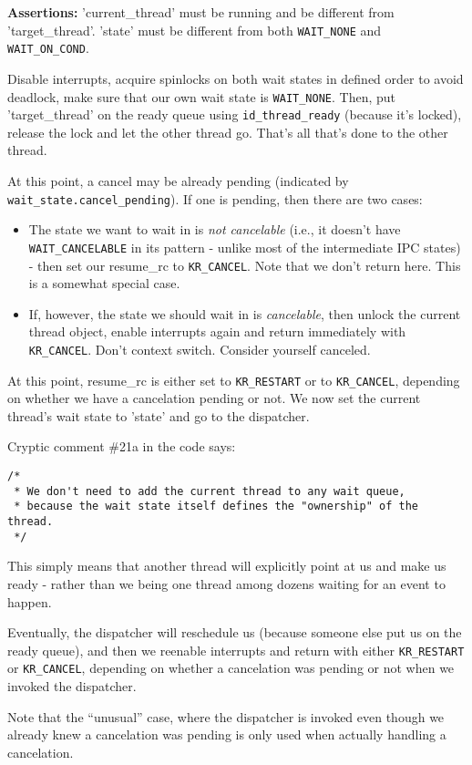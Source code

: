 \textbf{Assertions:} 'current_thread' must be running and be different
from 'target_thread'. 'state' must be different from both
\texttt{WAIT_NONE} and \texttt{WAIT_ON_COND}.

Disable interrupts, acquire spinlocks on both wait states in defined
order to avoid deadlock, make sure that our own wait state is
\texttt{WAIT_NONE}. Then, put 'target_thread' on the ready queue
using \texttt{id_thread_ready} (because it's locked), release
the lock and let the other thread go. That's all that's done to
the other thread.

At this point, a cancel may be already pending (indicated by
\texttt{wait_state.cancel_pending}). If one is pending, then there are
two cases:
\begin{itemize}
    \item The state we want to wait in is {\em not cancelable} (i.e.,
        it doesn't have \texttt{WAIT_CANCELABLE} in its pattern - unlike
        most of the intermediate IPC states) - then set our resume_rc
        to \texttt{KR_CANCEL}. Note that we don't return here.
        This is a somewhat special case.
    \item If, however, the state we should wait in is {\em cancelable},
        then unlock the current thread object, enable interrupts again
        and return immediately with \texttt{KR_CANCEL}.
        Don't context switch. Consider yourself canceled.
\end{itemize}
At this point, resume_rc is either set to \texttt{KR_RESTART} or
to \texttt{KR_CANCEL}, depending on whether we have a cancelation
pending or not. We now set the current thread's wait state to 'state'
and go to the dispatcher.

Cryptic comment \#21a in the code says:
\begin{verbatim}
/*
 * We don't need to add the current thread to any wait queue,
 * because the wait state itself defines the "ownership" of the thread.
 */
\end{verbatim}
This simply means that another thread will explicitly point at us and
make us ready - rather than we being one thread among dozens waiting
for an event to happen.

Eventually, the dispatcher will reschedule us (because someone else
put us on the ready queue), and then we reenable interrupts and return
with either \texttt{KR_RESTART} or \texttt{KR_CANCEL}, depending on
whether a cancelation was pending or not when we invoked the
dispatcher.

Note that the ``unusual'' case, where the dispatcher is invoked
even though we already knew a cancelation was pending is only used
when actually handling a cancelation.


